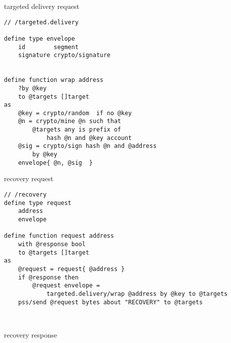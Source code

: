 
\begin{definition}{targeted delivery request}\label{def:targeted-delivery}
\begin{lstlisting}[language=buzz1]
// /targeted.delivery

define type envelope
    id        segment
    signature crypto/signature


define function wrap address
    ?by @key
    to @targets []target
as
    @key = crypto/random  if no @key
    @n = crypto/mine @n such that
        @targets any is prefix of
            hash @n and @key account
    @sig = crypto/sign hash @n and @address 
        by @key 
    envelope{ @n, @sig  }            

\end{lstlisting}
\end{definition}

\begin{definition}{recovery request}\label{def:recovery-request}
\begin{lstlisting}[language=buzz1]
// /recovery
define type request
    address
    envelope
    
define function request address
    with @response bool
    to @targets []target
as  
    @request = request{ @address }
    if @response then
        @request envelope =
            targeted.delivery/wrap @address by @key to @targets
    pss/send @request bytes about "RECOVERY" to @targets
    
    

\end{lstlisting}
\end{definition}

\begin{definition}{recovery response}\label{def:recovery}
\begin{lstlisting}[language=buzz1]


    

\end{lstlisting}
\end{definition}